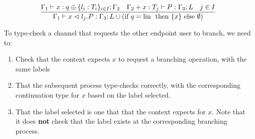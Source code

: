 $$
\frac{\Gamma_1 \vdash x : q \oplus \{l_i : T_i\}_{i \in I} ; \Gamma_2 \quad \Gamma_2 + x : T_j \vdash P : \Gamma_3 ; L \quad j \in I}{\Gamma_1 \vdash x \vartriangleleft l_j.P : \Gamma_3 ; L \cup (\text{if } q = \text{lin } \text{ then } \{x\} \text{ else } \emptyset)}
$$

To type-check a channel that requests the other endpoint user to branch, we need to:
\begin{enumerate}
    \item Check that the context expects $x$ to request a branching operation, with the same labels
    \item That the subsequent process type-checks correctly, with the corresponding continuation type for $x$ based on the label selected.
    \item That the label selected is one that that the context expects for $x$. Note that it does \textbf{not} check that the label exists at the corresponding branching process.
\end{enumerate}


